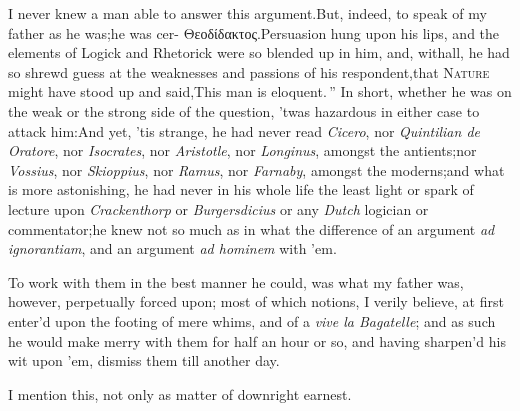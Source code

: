 \documentclass{article}
\begin{document}
I never knew a man able to answer this argument.\tsk But, indeed, to speak of
my father as he was;\tsk he was cer-
{\small Θεοδίδακτος}.\tsk Persuasion hung upon his lips, and the
elements of Logick and\break
Rhetorick were so blended up in him,\tsk\break
and, withall,
he had so shrewd guess at the weaknesses and passions of his
respondent,\tsh that \textsc{Nature} might have stood up and
said,\tsk \lqq This man is eloquent.\,” In short, whether he was
on the weak or the strong side of the que\-stion, ’twas hazardous in either
case to attack him:\tsk And yet, ’tis strange, he\break
had never read
\textit{Cicero}, nor \textit{Quintilian de Oratore}, nor \textit{Isocrates}, nor
\textit{Aristotle}, nor \textit{Longinus}, amongst the antients;\tsk nor
\textit{Vossius}, nor \textit{Skioppius}, nor \textit{Ramus},
nor\break
\textit{Farnaby}, amongst the moderns;\tsk and\break
what is more astonishing, he had never in\break
his whole life the least light or spark of\break
{} 
lecture upon \textit{Crackenthorp} or \textit{Burgersdicius} or any
\textit{Dutch} logician or commentator;\tsk he knew not so much as in what the
difference of an argument \textit{ad igno\-rantiam}, and an argument \textit{ad
hominem}\break
{}
with ’em.

To work with them in the best manner he could, was what my
father was, however, perpetually forced upon;\tsh\break 
{}
most of which notions, I verily believe, at
first enter’d upon the footing of mere whims, and of a \textit{vive la
Bagatelle}; and as such he would make merry with them for half
an hour or so, and having sharpen’d his wit upon ’em, dismiss them
till another day.

I mention this, not only as matter of 
downright earnest.
\end{document}
